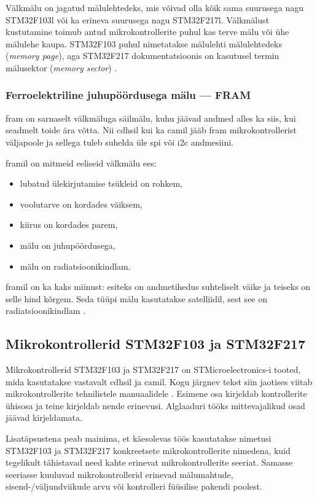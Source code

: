 \documentclass[12pt,a4paper]{article}
\begin{document}
Välkmälu on jagatud mälulehtedeks, mis võivad olla kõik sama suurusega nagu
STM32F103l või ka erineva suurusega nagu STM32F217l. Välkmälust kustutamine
toimub antud mikrokontrollerite puhul kas terve mälu või ühe mälulehe kaupa.
STM32F103 puhul nimetatakse mälulehti mälulehtedeks (\textit{memory page}), aga
STM32F217 dokumentatsioonis on kasutusel termin mälusektor (\textit{memory
sector}) \cite{f1fpm,f2fpm}.

\subsubsection{Ferroelektriline juhupöördusega mälu --- FRAM}
\gls{fram} on sarnaselt välkmäluga säilmälu, kuhu jäävad andmed alles ka siis, kui
seadmelt toide ära võtta. Nii \gls{cdhs}il kui ka \gls{cam}il jääb \gls{fram}
mikrokontrollerist väljapoole ja sellega tuleb suhelda üle \gls{spi} või
\gls{i2c} andmesiini.

\gls{fram}il on mitmeid eeliseid välkmälu ees:
\begin{itemize}
	\item lubatud ülekirjutamise tsükleid on rohkem,
	\item voolutarve on kordades väiksem,
	\item kiirus on kordades parem,
	\item mälu on juhupöördusega,
	\item mälu on radiatsioonikindlam.
\end{itemize}
\Gls{fram}il on ka kaks miinust: esiteks on andmetihedus suhteliselt väike ja
teiseks on selle hind kõrgem. Seda tüüpi mälu kasutatakse satelliidil, sest see
on radiatsioonikindlam \cite{fram}.

\subsection{Mikrokontrollerid STM32F103 ja STM32F217}
\label{sec:mcu}
Mikrokontrollerid STM32F103 ja STM32F217 on STMicroelectronics-i tooted,
mida kasutatakse vastavalt \gls{cdhs}il ja \gls{cam}il. Kogu järgnev tekst siin
jaotises viitab mikrokontrollerite tehnilistele manuaalidele \cite{f1rm,f2rm}.
Esimene osa kirjeldab kontrollerite ühisosa ja teine kirjeldab nende
erinevusi. Alglaaduri tööks mittevajalikud osad jäävad kirjeldamata.

Lisatäpsustena peab mainima, et käesolevas töös kasutatakse nimetusi STM32F103
ja STM32F217 konkreetsete mikrokontrollerite nimedena, kuid tegelikult
tähistavad need kahte erinevat mikrokontrollerite seeriat. Samasse seeriasse
kuuluvad mikrokontrollerid erinevad mälumahtude,
sisend-/väljund\-vii\-ku\-de arvu või kontrolleri füüsilise pakendi poolest.
\end{document}

